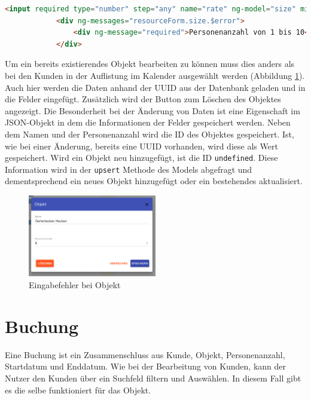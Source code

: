  \begin{lstlisting}[language=HTML, label=code_exampleRegistrationRequest, caption=Beispielhafte Antwort auf eine Registrierungsanfrage]
		<input required type="number" step="any" name="rate" ng-model="size" min="1" max="10"  />
            <div ng-messages="resourceForm.size.$error">
                <div ng-message="required">Personenanzahl von 1 bis 10</div>
            </div>
\end{lstlisting}
 
 

Um ein bereits existierendes Objekt bearbeiten zu können muss dies anders als bei den Kunden in der Auflistung im Kalender ausgewählt werden (Abbildung \ref{frontend_resource_edit}). Auch hier werden die Daten anhand der UUID aus der Datenbank geladen und in die Felder eingefügt. Zusätzlich wird der Button zum Löschen des Objektes angezeigt. Die Besonderheit bei der Änderung von Daten ist eine Eigenschaft im JSON-Objekt in dem die Informationen der Felder gespeichert werden. Neben dem Namen und der Personenanzahl wird die ID des Objektes gespeichert. Ist, wie bei einer Änderung, bereits eine UUID vorhanden, wird diese als Wert gespeichert. Wird ein Objekt neu hinzugefügt, ist die ID \texttt{undefined}. Diese Information wird in der \texttt{upsert} Methode des Models abgefragt und dementsprechend ein neues Objekt hinzugefügt oder ein bestehendes aktualisiert.



\begin{figure}[H]
\centering\includegraphics[width=0.5\textwidth]{images/frontend_resource_edit.png}
\caption{Eingabefehler bei Objekt}
\label{frontend_resource_edit}
\end{figure}


  
\section{Buchung}
Eine Buchung ist ein Zusammenschluss aus Kunde, Objekt, Personenanzahl, Startdatum und Enddatum. Wie bei der Bearbeitung von Kunden, kann der Nutzer den Kunden über ein Suchfeld filtern und Auswählen. In diesem Fall gibt es die selbe funktioniert für das Objekt. 

